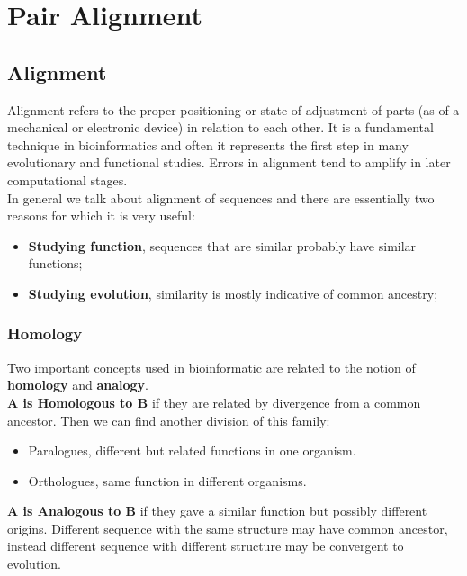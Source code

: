 \chapter{Pair Alignment}
\section{Alignment}
Alignment refers to the proper positioning or state of adjustment of parts (as of a mechanical or electronic device) in relation to each other.
It is a fundamental technique in bioinformatics and often it represents the first step in many evolutionary and functional studies. Errors in alignment tend to amplify in later computational stages.\\
In general we talk about alignment of sequences and there are essentially two reasons for which it is very useful:
\begin{itemize}
	\item \textbf{Studying function}, sequences that are similar probably have similar functions;
	\item \textbf{Studying evolution}, similarity is mostly indicative of common ancestry;
\end{itemize}

\subsection{Homology}
Two important concepts used in bioinformatic are related to the notion of \textbf{homology} and \textbf{analogy}.\\

\textbf{A is Homologous to B} if they are related by divergence from a common ancestor. Then we can find another division of this family:
\begin{itemize}
	\item Paralogues, different but related functions in one organism.
	\item Orthologues, same function in different organisms.
\end{itemize}

\textbf{A is Analogous to B} if they gave a similar function but possibly different origins. Different sequence with the same structure may have common ancestor, instead different sequence with different structure may be convergent to evolution.\\

